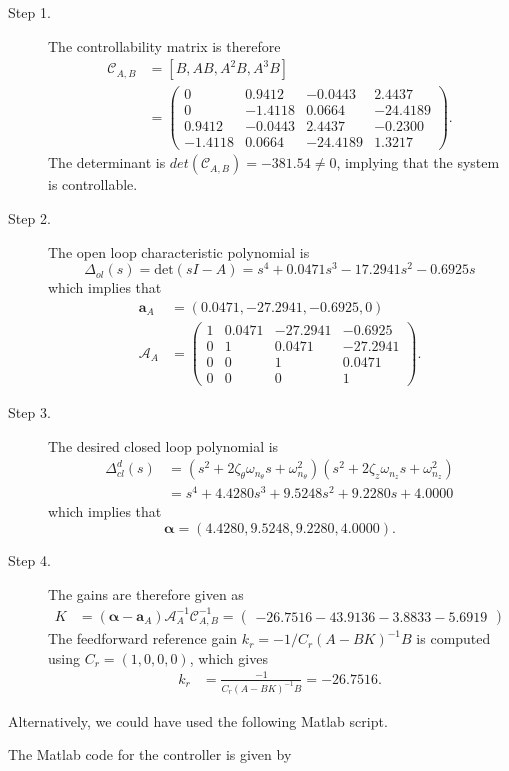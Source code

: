 \begin{description}
\item[Step 1.] 
The controllability matrix is therefore
\begin{align*}
\mathcal{C}_{A,B} &= [B, AB, A^2B, A^3B] \\
	&= \begin{pmatrix}           
	0 &   0.9412 &  -0.0443  &  2.4437 \\
    0  & -1.4118 &   0.0664 & -24.4189 \\
    0.9412  & -0.0443 &   2.4437 &  -0.2300 \\
   -1.4118  &  0.0664 & -24.4189 & 1.3217 \end{pmatrix}.
\end{align*}
The determinant is $det(\mathcal{C}_{A,B})=-381.54\neq 0$, implying that the system is controllable.  
\item[Step 2.] The open loop characteristic polynomial is
\[
\Delta_{ol}(s)=\text{det}(sI-A) = s^4 + 0.0471 s^3 - 17.2941 s^2 - 0.6925 s
\]
which implies that
\begin{align*}
\mathbf{a}_A &= (0.0471, -27.2941, -0.6925, 0) \\
\mathcal{A}_A &= \begin{pmatrix} 
1 & 0.0471 & -27.2941 & -0.6925 \\ 0 & 1 & 0.0471 & -27.2941 \\ 0 & 0 & 1 & 0.0471 \\ 0 & 0 & 0 & 1
\end{pmatrix}.
\end{align*}

\item[Step 3.] The desired closed loop polynomial is
\begin{align*}
\Delta_{cl}^d(s) &= (s^2+2\zeta_{\theta}\omega_{n_\theta} s + \omega_{n_\theta}^2)(s^2+2\zeta_{z}\omega_{n_z} s + \omega_{n_z}^2) \\
&=s^4 + 4.4280 s^3 + 9.5248 s^2 + 9.2280 s + 4.0000       
\end{align*}
which implies that
\[
\boldsymbol{\alpha} = (4.4280, 9.5248, 9.2280, 4.0000).
\]

\item[Step 4.]
The gains are therefore given as
\begin{align*}
K &= (\boldsymbol{\alpha}-\mathbf{a}_A)\mathcal{A}_A^{-1}\mathcal{C}_{A,B}^{-1} 
= \begin{pmatrix} -26.7516  -43.9136   -3.8833   -5.6919 \end{pmatrix}
\end{align*}
The feedforward reference gain $k_r=-1/C_r(A-BK)^{-1}B$ is computed using $C_r=(1,0,0,0)$, which gives
\begin{align*}
k_r &= \frac{-1}{C_r(A-BK)^{-1}B} 
  = -26.7516.
\end{align*}
\end{description}

Alternatively, we could have used the following Matlab script.



The Matlab code for the controller is given by 

